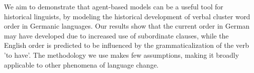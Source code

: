 We aim to demonstrate that agent-based models can be a useful tool for historical linguists, by modeling the historical development of verbal cluster word order in Germanic languages. Our results show that the current order in German may have developed due to increased use of subordinate clauses, while the English order is predicted to be influenced by the grammaticalization of the verb 'to have'. The methodology we use makes few assumptions, making it broadly applicable to other phenomena of language change.
